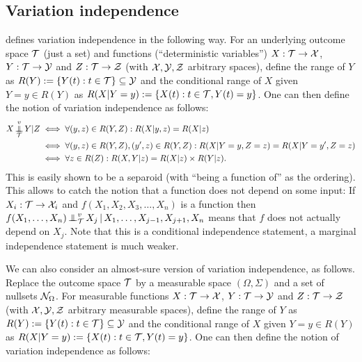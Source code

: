 \subsection{Variation independence}

\cite{Daw01b} defines variation independence in the following way.
For an underlying outcome space $\mathcal{T}$ (just a set) and functions (``deterministic variables'') 
$X : \mathcal{T} \to \mathcal{X}$, $Y : \mathcal{T} \to \mathcal{Y}$ and $Z : \mathcal{T} \to \mathcal{Z}$ (with $\mathcal{X},\mathcal{Y},\mathcal{Z}$ arbitrary spaces), define
the range of $Y$ as $R(Y) := \{Y(t) : t \in \mathcal{T}\} \subseteq \mathcal{Y}$ and the conditional range of $X$ given $Y=y \in R(Y)$ as
$R(X|Y=y) := \{X(t) : t \in \mathcal{T}, Y(t) = y\}$. One can then define the notion of variation independence as follows:
\begin{align*}
  X \operatorname*{\perp\mkern-11mu\perp}^v_{\mathcal{T}} Y | Z 
  &\iff \forall (y,z) \in R(Y,Z): R(X | y,z) = R(X|z) \\
  &\iff \forall (y,z) \in R(Y,Z), (y',z) \in R(Y,Z): R(X|Y=y,Z=z) = R(X|Y=y',Z=z) \\
  &\iff \forall z\in R(Z) : R(X,Y|z) = R(X|z) \times R(Y|z).
\end{align*}
This is easily shown to be a separoid (with ``being a function of'' as the ordering).
This allows to catch the notion that a function does not depend on some input:
If $X_i : \mathcal{T} \to \mathcal{X}_i$ and $f(X_1,X_2,X_3,\dots,X_n)$ is a function then
$f(X_1,\dots,X_n) \operatorname*{\perp\mkern-11mu\perp}^v_{\mathcal{T}} X_j \operatorname*{|} X_1,\dots,X_{j-1},X_{j+1},X_n$ means
that $f$ does not actually depend on $X_j$. Note that this is a conditional independence
statement, a marginal independence statement is much weaker. 

We can also consider an almost-sure version of variation independence, as follows.
Replace the outcome space $\mathcal{T}$ by a measurable space $(\Omega,\Sigma)$ and a set of nullsets $\mathcal{N}_\Omega$.
For measurable functions  
$X : \mathcal{T} \to \mathcal{X}$, $Y : \mathcal{T} \to \mathcal{Y}$ and $Z : \mathcal{T} \to \mathcal{Z}$ (with $\mathcal{X},\mathcal{Y},\mathcal{Z}$ arbitrary measurable spaces), define
the range of $Y$ as $R(Y) := \{Y(t) : t \in \mathcal{T}\} \subseteq \mathcal{Y}$ and the conditional range of $X$ given $Y=y \in R(Y)$ as
$R(X|Y=y) := \{X(t) : t \in \mathcal{T}, Y(t) = y\}$. One can then define the notion of variation independence as follows:

